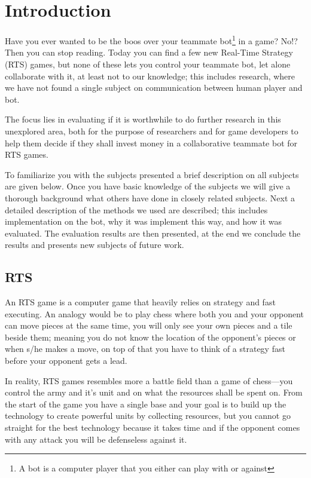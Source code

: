 \chapter{Introduction}
Have you ever wanted to be the boos over your teammate bot\footnote{A bot is a computer player that you either can play with or against} in a game? No!? Then you can stop reading. Today you can find a few new Real-Time Strategy (RTS) games, but none of these lets you control your teammate bot, let alone collaborate with it, at least not to our knowledge; this includes research, where we have not found a single subject on communication between human player and bot.

The focus lies in evaluating if it is worthwhile to do further research in this unexplored area, both for the purpose of researchers and for game developers to help them decide if they shall invest money in a collaborative teammate bot for RTS games.

To familiarize you with the subjects presented a brief description on all subjects are given below. Once you have basic knowledge of the subjects we will give a thorough background what others have done in closely related subjects. Next a detailed description of the methods we used are described; this includes implementation on the bot, why it was implement this way, and how it was evaluated. 
The evaluation results are then presented, at the end we conclude the results and presents new subjects of future work.

\section{RTS}
An RTS game is a computer game that heavily relies on strategy and fast executing. An analogy would be to play chess where both you and your opponent can move pieces at the same time, you will only see your own pieces and a tile beside them; meaning you do not know the location of the opponent’s pieces or when s/he makes a move, on top of that you have to think of a strategy fast before your opponent gets a lead.

In reality, RTS games resembles more a battle field than a game of chess—you control the army and it’s unit and on what the resources shall be spent on. From the start of the game you have a single base and your goal is to build up the technology to create powerful units by collecting resources, but you cannot go straight for the best technology because it takes time and if the opponent comes with any attack you will be defenseless against it.

